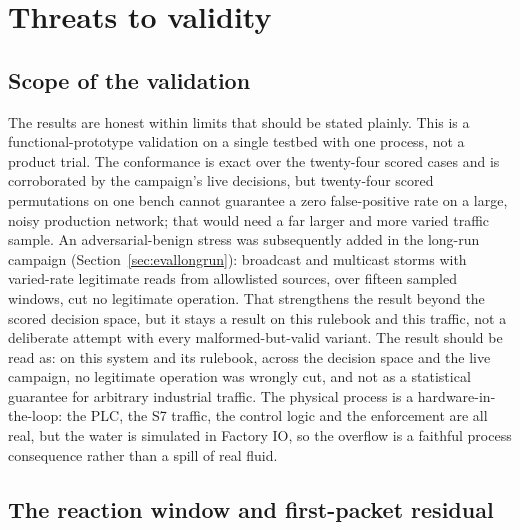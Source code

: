\section{Threats to validity}
\label{sec:threats}

\subsection{Scope of the validation}

The results are honest within limits that should be stated plainly. This is a functional-prototype validation on a single testbed with one process, not a product trial. The conformance is exact over the twenty-four scored cases and is corroborated by the campaign's live decisions, but twenty-four scored permutations on one bench cannot guarantee a zero false-positive rate on a large, noisy production network; that would need a far larger and more varied traffic sample. An adversarial-benign stress was subsequently added in the long-run campaign (Section~\ref{sec:evallongrun}): broadcast and multicast storms with varied-rate legitimate reads from allowlisted sources, over fifteen sampled windows, cut no legitimate operation. That strengthens the result beyond the scored decision space, but it stays a result on this rulebook and this traffic, not a deliberate attempt with every malformed-but-valid variant. The result should be read as: on this system and its rulebook, across the decision space and the live campaign, no legitimate operation was wrongly cut, and not as a statistical guarantee for arbitrary industrial traffic. The physical process is a hardware-in-the-loop: the PLC, the S7 traffic, the control logic and the enforcement are all real, but the water is simulated in Factory IO, so the overflow is a faithful process consequence rather than a spill of real fluid.

\subsection{The reaction window and first-packet residual}

